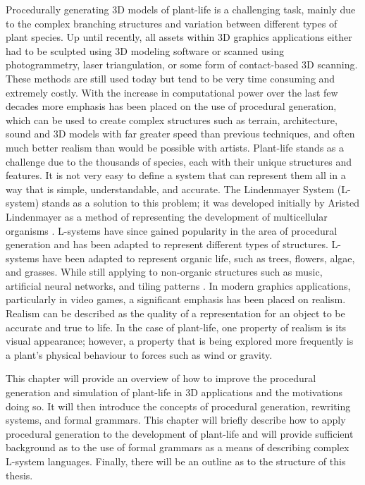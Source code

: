 \lettrine[lines=3]{P}{}rocedurally generating 3D models of plant-life is a challenging task, mainly due to the complex branching structures and variation between different types of plant species. Up until recently, all assets within 3D graphics applications either had to be sculpted using 3D modeling software or scanned using photogrammetry, laser triangulation, or some form of contact-based 3D scanning. These methods are still used today but tend to be very time consuming and extremely costly. With the increase in computational power over the last few decades more emphasis has been placed on the use of procedural generation, which can be used to create complex structures such as terrain, architecture, sound and 3D models with far greater speed than previous techniques, and often much better realism than would be possible with artists. Plant-life stands as a challenge due to the thousands of species, each with their unique structures and features. It is not very easy to define a system that can represent them all in a way that is simple, understandable, and accurate. The Lindenmayer System (L-system) stands as a solution to this problem; it was developed initially by Aristed Lindenmayer as a method of representing the development of multicellular organisms \cite{lindenmayer1968mathematical}. L-systems have since gained popularity in the area of procedural generation and has been adapted to represent different types of structures. L-systems have been adapted to represent organic life, such as trees, flowers, algae, and grasses. While still applying to non-organic structures such as music, artificial neural networks, and tiling patterns \cite{Prusinkiewicz1989}. In modern graphics applications, particularly in video games, a significant emphasis has been placed on realism. Realism can be described as the quality of a representation for an object to be accurate and true to life. In the case of plant-life, one property of realism is its visual appearance; however, a property that is being explored more frequently is a plant's physical behaviour to forces such as wind or gravity.

This chapter will provide an overview of how to improve the procedural generation and simulation of plant-life in 3D applications and the motivations doing so. It will then introduce the concepts of procedural generation, rewriting systems, and formal grammars. This chapter will briefly describe how to apply procedural generation to the development of plant-life and will provide sufficient background as to the use of formal grammars as a means of describing complex L-system languages. Finally, there will be an outline as to the structure of this thesis.

